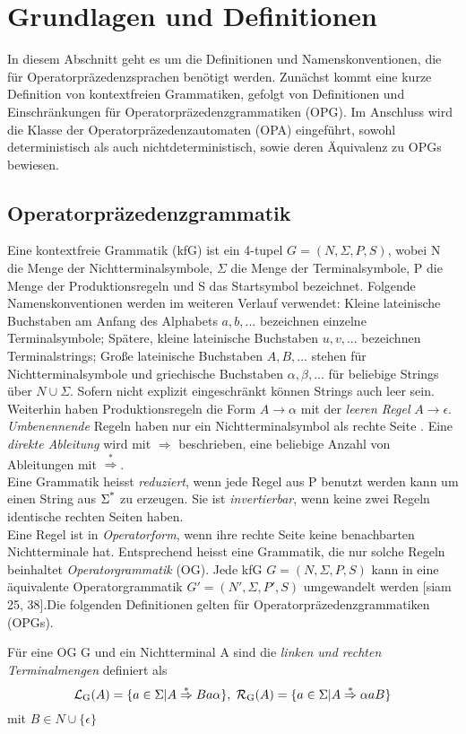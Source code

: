 \section{Grundlagen und Definitionen}
In diesem Abschnitt geht es um die Definitionen und Namenskonventionen, die für Operatorpräzedenzsprachen benötigt werden. Zunächst kommt eine kurze Definition von kontextfreien Grammatiken, gefolgt von Definitionen und Einschränkungen für Operatorpräzedenzgrammatiken (OPG). Im Anschluss wird die Klasse der Operatorpräzedenzautomaten (OPA) eingeführt, sowohl deterministisch als auch nichtdeterministisch, sowie deren Äquivalenz zu OPGs bewiesen. 
\subsection{Operatorpräzedenzgrammatik}
Eine kontextfreie Grammatik (kfG) ist ein 4-tupel $G = (N, \Sigma, P, S)$, wobei N die Menge der Nichtterminalsymbole, $\Sigma$ die Menge der Terminalsymbole, P die Menge der Produktionsregeln und S das Startsymbol bezeichnet. Folgende Namenskonventionen werden im weiteren Verlauf verwendet: Kleine lateinische Buchstaben am Anfang des Alphabets $a, b, ...$ bezeichnen einzelne Terminalsymbole; Spätere, kleine lateinische Buchstaben $u,v, ...$ bezeichnen Terminalstrings; Große lateinische Buchstaben $A, B, ...$ stehen für Nichtterminalsymbole und griechische Buchstaben $\alpha, \beta, ...$ für beliebige Strings über $N \cup \Sigma$. Sofern nicht explizit eingeschränkt können Strings auch leer sein.\\
Weiterhin haben Produktionsregeln die Form $A \rightarrow \alpha$ mit der \textit{leeren Regel} $A \rightarrow \epsilon$. \textit{Umbenennende} Regeln haben nur ein Nichtterminalsymbol als rechte Seite . Eine \textit{direkte Ableitung} wird mit $\Rightarrow$ beschrieben, eine beliebige Anzahl von Ableitungen mit $\overset{*}{\Rightarrow}$.
\\
Eine Grammatik heisst \textit{reduziert}, wenn jede Regel aus P benutzt werden kann um einen String aus $\Sigma\textsuperscript{*}$ zu erzeugen. Sie ist \textit{invertierbar}, wenn keine zwei Regeln identische rechten Seiten haben.\\
Eine Regel ist in \textit{Operatorform}, wenn ihre rechte Seite keine benachbarten Nichtterminale hat. Entsprechend heisst eine Grammatik, die nur solche Regeln beinhaltet \textit{Operatorgrammatik} (OG). Jede kfG $G=(N,\Sigma, P, S)$ kann in eine äquivalente Operatorgrammatik $G'=(N', \Sigma, P', S)$ umgewandelt werden [siam 25, 38].Die folgenden Definitionen gelten für Operatorpräzedenzgrammatiken (OPGs). \\
\begin{definition}

Für eine OG G und ein Nichtterminal A sind die \textit{linken und rechten Terminalmengen}  definiert als 
$$ \mathcal{L} \textsubscript{G}(A) = \{ a \in \Sigma | A \overset{*}{\Rightarrow} Ba \alpha \}, \;
 \mathcal{R} \textsubscript{G}(A) = \{ a \in \Sigma | A \overset{*}{\Rightarrow} \alpha aB \}$$
mit $B \in N \cup \{\epsilon\}$
\end{definition}

